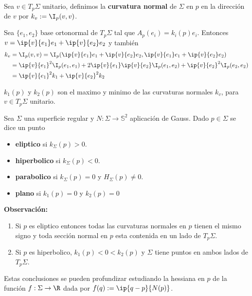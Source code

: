 \documentclass{article}
\begin{document}
\begin{dfn}
    Sea $v\in T_{p}\Sigma$ unitario, definimos la \textbf{curvatura normal} de $\Sigma$ en $p$ en
    la dirección de $v$ por $k_{v}:=\I_{p}(v,v)$.
\end{dfn}
\noindent Sea $\{e_{1},e_{2}\}$ base ortonormal de $T_{p}\Sigma$ tal que $A_{p}(e_{i})=
k_{i}(p)e_{i}$. Entonces $v=\ip{v}{e_{1}}e_{1}+\ip{v}{e_{2}}e_{2}$ y también
\begin{align*}
    k_{v} &= \I_{p}(v,v)=\I_{p}(\ip{v}{e_{1}}e_{1}+\ip{v}{e_{2}}e_{2},
    \ip{v}{e_{1}}e_{1}+\ip{v}{e_{2}}e_{2}) \\
    &= \ip{v}{e_{1}}^{2}\I_{p}(e_{1},e_{1})+2\ip{v}{e_{1}}\ip{v}{e_{2}}\I_{p}(e_{1},e_{2})+
    \ip{v}{e_{2}}^{2}\I_{p}(e_{2},e_{2}) \\
    &= \ip{v}{e_{1}}^{2}k_{1}+\ip{v}{e_{2}}^{2}k_{2}
\end{align*}
\begin{cor}
    $k_{1}(p)$ y $k_{2}(p)$ son el maximo y minimo de las curvaturas normales $k_{v}$, para 
    $v\in T_{p}\Sigma$ unitario.
\end{cor}

\begin{dfn}
    Sea $\Sigma$ una superficie regular y $N:\Sigma\to\mathbb{S}^{2}$ aplicación de Gauss. Dado 
    $p\in\Sigma$ se dice un punto
    \begin{itemize}
        \item \textbf{eliptico} si $k_{\Sigma}(p)>0$.
        \item \textbf{hiperbolico} si $k_{\Sigma}(p)<0$.
        \item \textbf{parabolico} si $k_{\Sigma}(p)=0$ y $H_{\Sigma}(p)\neq0$.
        \item \textbf{plano} si $k_{1}(p)=0$ y $k_{2}(p)=0$
    \end{itemize}
\end{dfn}
\noindent\textbf{Observación:}
\begin{enumerate}
    \item Si $p$ es eliptico entonces todas las curvaturas normales en $p$ tienen el mismo signo y
    toda sección normal en $p$ esta contenida en un lado de $T_{p}\Sigma$.

    \item Si $p$ es hiperbolico, $k_{1}(p)<0<k_{2}(p)$ y $\Sigma$ tiene puntos en ambos lados de
    $T_{p}\Sigma$.
\end{enumerate}
Estas conclusiones se pueden profundizar estudiando la hessiana en $p$ de la función 
$f:\Sigma\to\R$ dada por $f(q):=\ip{q-p}{N(p)}$.
\end{document}
